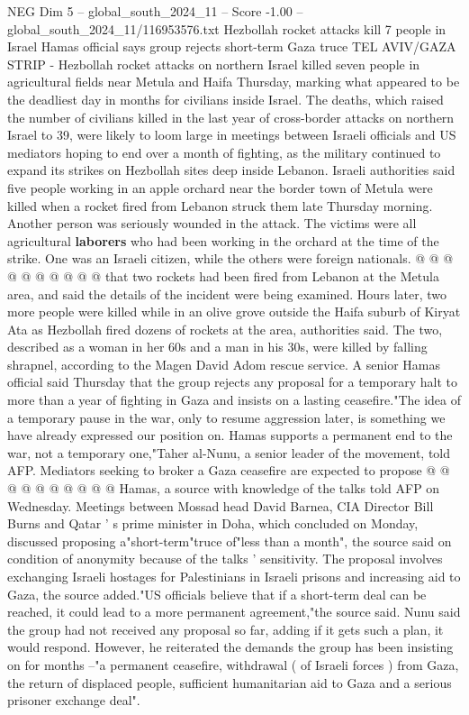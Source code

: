 \begin{textsample}{NEG Dim 5 – global\_south\_2024\_11 – Score -1.00 – global\_south\_2024\_11/116953576.txt}  \label{ex:f5_neg_432}
Hezbollah rocket attacks kill 7 people in Israel Hamas official says group rejects short-term Gaza truce TEL AVIV/GAZA STRIP - Hezbollah rocket attacks on northern Israel killed seven people in agricultural fields near Metula and Haifa Thursday, marking what appeared to be the deadliest day in months for civilians inside Israel.
The deaths, which raised the number of civilians killed in the last year of cross-border attacks on northern Israel to 39, were likely to loom large in meetings between Israeli officials and US mediators hoping to end over a month of fighting, as the military continued to expand its strikes on Hezbollah sites deep inside Lebanon.
Israeli authorities said five people working in an apple orchard near the border town of Metula were killed when a rocket fired from Lebanon struck them late Thursday morning.
Another person was seriously wounded in the attack.
The victims were all agricultural \textbf{laborers} who had been working in the orchard at the time of the strike.
One was an Israeli citizen, while the others were foreign nationals. @ @ @ @ @ @ @ @ @ @ that two rockets had been fired from Lebanon at the Metula area, and said the details of the incident were being examined.
Hours later, two more people were killed while in an olive grove outside the Haifa suburb of Kiryat Ata as Hezbollah fired dozens of rockets at the area, authorities said.
The two, described as a woman in her 60s and a man in his 30s, were killed by falling shrapnel, according to the Magen David Adom rescue service.
A senior Hamas official said Thursday that the group rejects any proposal for a temporary halt to more than a year of fighting in Gaza and insists on a lasting ceasefire."The idea of a temporary pause in the war, only to resume aggression later, is something we have already expressed our position on.
Hamas supports a permanent end to the war, not a temporary one,"Taher al-Nunu, a senior leader of the movement, told AFP.
Mediators seeking to broker a Gaza ceasefire are expected to propose @ @ @ @ @ @ @ @ @ @ Hamas, a source with knowledge of the talks told AFP on Wednesday.
Meetings between Mossad head David Barnea, CIA Director Bill Burns and Qatar ' s prime minister in Doha, which concluded on Monday, discussed proposing a"short-term"truce of"less than a month", the source said on condition of anonymity because of the talks ' sensitivity.
The proposal involves exchanging Israeli hostages for Palestinians in Israeli prisons and increasing aid to Gaza, the source added."US officials believe that if a short-term deal can be reached, it could lead to a more permanent agreement,"the source said.
Nunu said the group had not received any proposal so far, adding if it gets such a plan, it would respond.
However, he reiterated the demands the group has been insisting on for months --"a permanent ceasefire, withdrawal ( of Israeli forces ) from Gaza, the return of displaced people, sufficient humanitarian aid to Gaza and a serious prisoner exchange deal".

\end{textsample}
